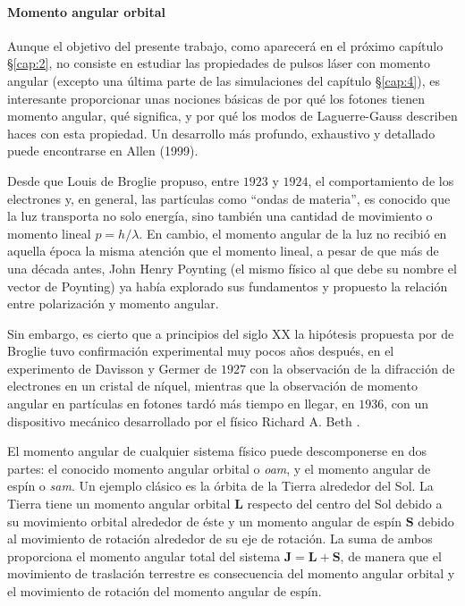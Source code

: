 \paragraph{Momento angular orbital}
Aunque el objetivo del presente trabajo, como aparecerá en el próximo capítulo \S\ref{cap:2}, no consiste en estudiar las propiedades de pulsos láser con momento angular (excepto una última parte de las simulaciones del capítulo \S\ref{cap:4}), es interesante proporcionar unas nociones básicas de por qué los fotones tienen momento angular, qué significa, y por qué los modos de Laguerre-Gauss describen haces con esta propiedad. Un desarrollo más profundo, exhaustivo y detallado puede encontrarse en Allen (1999)\autocite{Allen1999}.

Desde que Louis de Broglie propuso, entre $1923$\autocite{deBroglie1923} y $1924$\autocite{deBroglie1924}, el comportamiento de los electrones y, en general, las partículas como \enquote{ondas de materia}, es conocido que la luz transporta no solo energía, sino también una cantidad de movimiento o momento lineal $p = h/\lambda$. En cambio, el momento angular de la luz no recibió en aquella época la misma atención que el momento lineal, a pesar de que más de una década antes, John Henry Poynting \autocite{Poynting1909} (el mismo físico al que debe su nombre el vector de Poynting) ya había explorado sus fundamentos y propuesto la relación entre polarización y momento angular. 

Sin embargo, es cierto que a principios del siglo \RN{20} la hipótesis propuesta por de Broglie tuvo confirmación experimental muy pocos años después, en el experimento de Davisson y Germer de $1927$ \autocite{Davisson1927} con la observación de la difracción de electrones en un cristal de níquel, mientras que la observación de momento angular en partículas en fotones tardó más tiempo en llegar, en $1936$, con un dispositivo mecánico desarrollado por el físico Richard A. Beth \autocite{Beth1936}.

El momento angular de cualquier sistema físico puede descomponerse en dos partes: el conocido momento angular orbital o \emph{\acrfull{oam}}, y el momento angular de espín o \emph{\acrfull{sam}}. Un ejemplo clásico \autocite{Tipler2021b} es la órbita de la Tierra alrededor del Sol. La Tierra tiene un momento angular orbital $\symbf{L}$ respecto del centro del Sol debido a su movimiento orbital alrededor de éste y un momento angular de espín $\symbf{S}$ debido al movimiento de rotación alrededor de su eje de rotación. La suma de ambos proporciona el momento angular total del sistema $\symbf{J} = \symbf{L} + \symbf{S}$, de manera que el movimiento de traslación terrestre es consecuencia del momento angular orbital y el movimiento de rotación del momento angular de espín.

